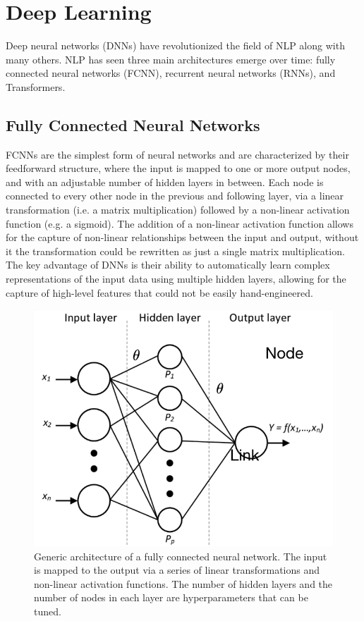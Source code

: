 \section{Deep Learning}
Deep neural networks (DNNs) have revolutionized the field of NLP along with many others. NLP has seen three main architectures emerge over time: fully connected neural networks (FCNN), recurrent neural networks (RNNs), and Transformers.

\subsection{Fully Connected Neural Networks}
FCNNs are the simplest form of neural networks and are characterized by their feedforward structure, where the input is mapped to one or more output nodes, and with an adjustable number of hidden layers in between.
Each node is connected to every other node in the previous and following layer, via a linear transformation (i.e. a matrix multiplication) followed by a non-linear activation function (e.g. a sigmoid).
The addition of a non-linear activation function allows for the capture of non-linear relationships between the input and output, without it the transformation could be rewritten as just a single matrix multiplication.
The key advantage of DNNs is their ability to automatically learn complex representations of the input data using multiple hidden layers, allowing for the capture of high-level features that could not be easily hand-engineered.

\begin{figure}[h]
    \includegraphics[width=\linewidth]{chapters/NLP/figures/model_architecture.png}
    \caption{Generic architecture of a fully connected neural network. The input is mapped to the output via a series of linear transformations and non-linear activation functions. The number of hidden layers and the number of nodes in each layer are hyperparameters that can be tuned.}
    \label{fig:model_architecture}
\end{figure}

